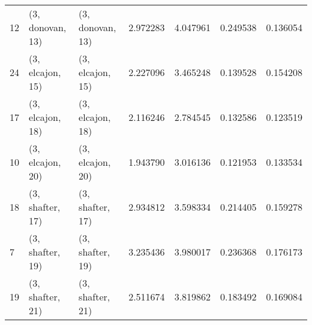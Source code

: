 \begin{tabular}{lllrrrr}
12 &  (3, donovan, 13) &  (3, donovan, 13) &  2.972283 &  4.047961 &   0.249538 &  0.136054 \\
24 &  (3, elcajon, 15) &  (3, elcajon, 15) &  2.227096 &  3.465248 &   0.139528 &  0.154208 \\
17 &  (3, elcajon, 18) &  (3, elcajon, 18) &  2.116246 &  2.784545 &   0.132586 &  0.123519 \\
10 &  (3, elcajon, 20) &  (3, elcajon, 20) &  1.943790 &  3.016136 &   0.121953 &  0.133534 \\
18 &  (3, shafter, 17) &  (3, shafter, 17) &  2.934812 &  3.598334 &   0.214405 &  0.159278 \\
7  &  (3, shafter, 19) &  (3, shafter, 19) &  3.235436 &  3.980017 &   0.236368 &  0.176173 \\
19 &  (3, shafter, 21) &  (3, shafter, 21) &  2.511674 &  3.819862 &   0.183492 &  0.169084 \\
\bottomrule
\end{tabular}

